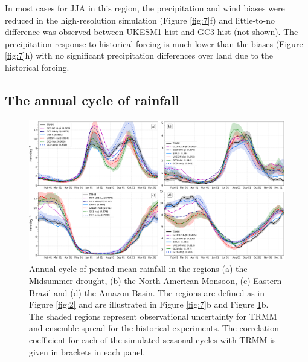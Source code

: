 In most cases for JJA in this region, the precipitation and wind biases were reduced in the high-resolution simulation (Figure \ref{fig:7}f) and little-to-no difference was observed between UKESM1-hist and GC3-hist (not shown).
The precipitation response to historical forcing is much lower than the biases (Figure \ref{fig:7}h) with no significant precipitation differences over land due to the historical forcing. %
 

\subsection{The annual cycle of rainfall}\label{sq:raincycle}

\begin{figure}[b!]
\centering
 \includegraphics[width=1.0\linewidth]{figures/amipseasonalcycle.png}
\caption{Annual cycle of pentad-mean rainfall in the regions (a) the Midsummer drought, (b) the North American Monsoon, (c) Eastern Brazil and (d) the Amazon Basin. The regions are defined as in Figure \ref{fig:2} and are illustrated in Figure \ref{fig:7}b and Figure \ref{fig:8}b. The shaded regions represent observational uncertainty for TRMM and ensemble spread for the historical experiments. The correlation coefficient for each of the simulated seasonal cycles with TRMM is given in brackets in each panel.  }
\label{fig:8}
\end{figure}


